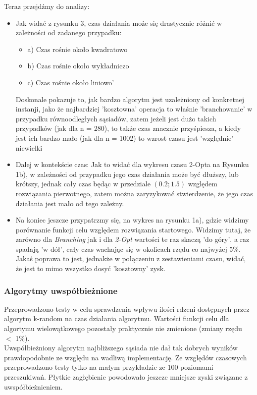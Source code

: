 \documentclass{article}
\begin{document}
Teraz przejdźmy do analizy:
\begin{itemize}
	\item Jak widać z rysunku 3, czas działania może się drastycznie różnić w zależności od zadanego przypadku:
	\begin{itemize}
		\item a) Czas rośnie około kwadratowo
		\item b) Czas rośnie około wykładniczo
		\item c) Czas rośnie około liniowo'
	\end{itemize}
	Doskonale pokazuje to, jak bardzo algorytm jest uzależniony od konkretnej instanji, jako że najbardziej 'kosztowna' operacja to właśnie 'branchowanie' w przypadku równoodległych sąsiadów, zatem jeżeli jest dużo takich przypadków (jak dla n = 280), to także czas znacznie przyśpiesza, a kiedy jest ich bardzo mało (jak dla n = 1002) to wzrost czasu jest 'względnie' niewielki
	\item Dalej w kontekście czas: Jak to widać dla wykresu czasu 2-Opta na Rysunku 1b), w zależności od przypadku jego czas działania może być dłuższy, lub krótszy, jednak cały czas będąc w przedziale $(0.2; 1.5)$ względem rozwiązania pierwotnego, zatem można zaryzykować stwierdzenie, że jego czas działania jest mało od tego zależny.
	\item Na koniec jeszcze przypatrzmy się, na wykres na rysunku 1a), gdzie widzimy porównanie funkcji celu względem rozwiązania startowego. Widzimy tutaj, że zarówno dla \textit{Branching} jak i dla \textit{2-Opt} wartości te raz skaczą 'do góry', a raz spadają 'w dół', cały czas wachając się w okolicach rzędu co najwyżej 5\%. Jakaś poprawa to jest, jednakże  w połączeniu z zestawieniami czasu, widać, że jest to mimo wszystko dosyć 'kosztowny' zysk.
\end{itemize}

\newpage
\subsubsection{Algorytmy uwspółbieżnione}

Przeprowadzono testy w celu sprawdzenia wpływu ilości rdzeni dostępnych przez algorytm k-random na czas działania algorytmu. Wartości funkcji celu dla algortymu wielowątkowego pozostały praktycznie nie zmienione (zmiany rzędu $<$ 1\%).\\
Uwspółbieżniony algorytm najbliższego sąsiada nie dał tak dobrych wyników prawdopodobnie ze względu na wadliwą implementację. Ze względów czasowych przeprowadzono testy tylko na małym przykładzie ze 100 poziomami przeszukiwań. Płytkie zagłębienie powodowało jeszcze mniejsze zyski związane z uwspółbieżnieniem.
\end{document}
